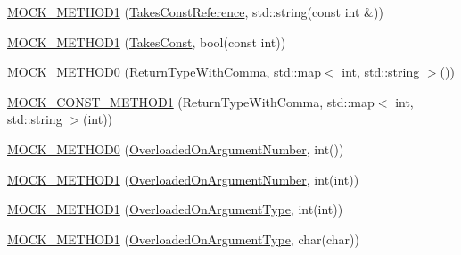 \begin{DoxyCompactItemize}
\item 
\mbox{\hyperlink{classtesting_1_1gmock__generated__function__mockers__test_1_1MockFoo_a94d9e3801000de6dec4b4394a12a9349}{M\+O\+C\+K\+\_\+\+M\+E\+T\+H\+O\+D1}} (\mbox{\hyperlink{classtesting_1_1gmock__generated__function__mockers__test_1_1FooInterface_aae85be7a3d1b53625fbeeac4694292d3}{Takes\+Const\+Reference}}, std\+::string(const int \&))
\item 
\mbox{\hyperlink{classtesting_1_1gmock__generated__function__mockers__test_1_1MockFoo_a7b548776b156454bcddecaca6294c52f}{M\+O\+C\+K\+\_\+\+M\+E\+T\+H\+O\+D1}} (\mbox{\hyperlink{classtesting_1_1gmock__generated__function__mockers__test_1_1FooInterface_a8c53e87edf0b9da878e5259f02b7f5dc}{Takes\+Const}}, bool(const int))
\item 
\mbox{\hyperlink{classtesting_1_1gmock__generated__function__mockers__test_1_1MockFoo_adda63f3a046fadc9ad44731240d441e2}{M\+O\+C\+K\+\_\+\+M\+E\+T\+H\+O\+D0}} (Return\+Type\+With\+Comma, std\+::map$<$ int, std\+::string $>$())
\item 
\mbox{\hyperlink{classtesting_1_1gmock__generated__function__mockers__test_1_1MockFoo_a921e9d77c56ab58ef3881de92ffa3ae0}{M\+O\+C\+K\+\_\+\+C\+O\+N\+S\+T\+\_\+\+M\+E\+T\+H\+O\+D1}} (Return\+Type\+With\+Comma, std\+::map$<$ int, std\+::string $>$(int))
\item 
\mbox{\hyperlink{classtesting_1_1gmock__generated__function__mockers__test_1_1MockFoo_a1666c565d1b48b351a1a453f6f87ff22}{M\+O\+C\+K\+\_\+\+M\+E\+T\+H\+O\+D0}} (\mbox{\hyperlink{classtesting_1_1gmock__generated__function__mockers__test_1_1FooInterface_ae9e86ac64fa9acedfb1fa747174c7f43}{Overloaded\+On\+Argument\+Number}}, int())
\item 
\mbox{\hyperlink{classtesting_1_1gmock__generated__function__mockers__test_1_1MockFoo_a45014dba5c27e9d59af3a94e0d324096}{M\+O\+C\+K\+\_\+\+M\+E\+T\+H\+O\+D1}} (\mbox{\hyperlink{classtesting_1_1gmock__generated__function__mockers__test_1_1FooInterface_ae9e86ac64fa9acedfb1fa747174c7f43}{Overloaded\+On\+Argument\+Number}}, int(int))
\item 
\mbox{\hyperlink{classtesting_1_1gmock__generated__function__mockers__test_1_1MockFoo_ad900c5945fc52a0a95ca1480207c7add}{M\+O\+C\+K\+\_\+\+M\+E\+T\+H\+O\+D1}} (\mbox{\hyperlink{classtesting_1_1gmock__generated__function__mockers__test_1_1FooInterface_ad9cc9a11570403fb8378ed6620892ec6}{Overloaded\+On\+Argument\+Type}}, int(int))
\item 
\mbox{\hyperlink{classtesting_1_1gmock__generated__function__mockers__test_1_1MockFoo_ab4b323a9c06a48c1116d55419195c1a6}{M\+O\+C\+K\+\_\+\+M\+E\+T\+H\+O\+D1}} (\mbox{\hyperlink{classtesting_1_1gmock__generated__function__mockers__test_1_1FooInterface_ad9cc9a11570403fb8378ed6620892ec6}{Overloaded\+On\+Argument\+Type}}, char(char))

\end{DoxyCompactItemize}
